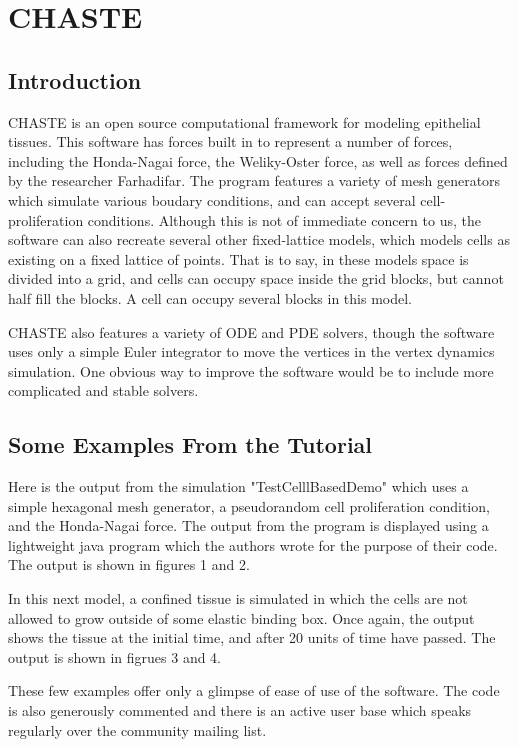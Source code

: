 \chapter{CHASTE}
\section{Introduction}
CHASTE is an open source computational framework for modeling epithelial tissues. This  software has forces built in to represent a number of forces, including the Honda-Nagai force, the Weliky-Oster force, as well as forces defined by the researcher Farhadifar. The program features a variety of mesh generators which simulate various boudary conditions, and can accept several cell-proliferation conditions. Although this is not of immediate concern to us, the software can also recreate several other fixed-lattice models, which models cells as existing on a fixed lattice of points. That is to say, in these models space is divided into a grid, and cells can occupy space inside the grid blocks, but cannot half fill the blocks. A cell can occupy several blocks in this model.

CHASTE also features a variety of ODE and PDE solvers, though the software uses only a simple Euler integrator to move the vertices in the vertex dynamics simulation. One obvious way to improve the software would be to include more complicated and stable solvers.

\section{Some Examples From the Tutorial}
Here is the output from the simulation "TestCelllBasedDemo" which uses a simple hexagonal mesh generator, a pseudorandom cell proliferation condition, and the Honda-Nagai force. The output from the program is displayed using a lightweight java program which the authors wrote for the purpose of their code. The output is shown in figures 1 and 2.


In this next model, a confined tissue is simulated in which  the cells are not allowed to grow outside of some elastic binding box. Once again, the output shows the tissue at the initial time, and after 20 units of time have passed. The output is shown in figrues 3 and 4.


These few examples offer only a glimpse of ease of use of the software. The code is also generously commented and there is an active user base which speaks regularly over the community mailing list.

